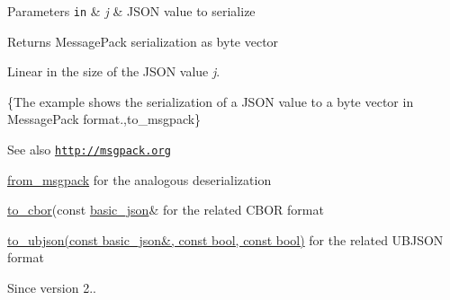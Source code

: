 \begin{DoxyParams}[1]{Parameters}
\mbox{\tt in}  & {\em j} & J\+S\+ON value to serialize \\
\hline
\end{DoxyParams}
\begin{DoxyReturn}{Returns}
Message\+Pack serialization as byte vector
\end{DoxyReturn}
Linear in the size of the J\+S\+ON value {\itshape j}.

\{The example shows the serialization of a J\+S\+ON value to a byte vector in Message\+Pack format.,to\+\_\+msgpack\}

\begin{DoxySeeAlso}{See also}
\href{http://msgpack.org}{\tt http\+://msgpack.\+org} 

\hyperlink{classnlohmann_1_1basic__json_adbcab52fca1e25b3311ef14e71a57590}{from\+\_\+msgpack} for the analogous deserialization 

\hyperlink{classnlohmann_1_1basic__json_adabcf74c9c868da3e04a5546b7705af4}{to\+\_\+cbor}(const \hyperlink{classnlohmann_1_1basic__json}{basic\+\_\+json}\& for the related C\+B\+OR format 

\hyperlink{classnlohmann_1_1basic__json_a25355b9719db23b189fb5f6a8f4f16c4}{to\+\_\+ubjson(const basic\+\_\+json\&, const bool, const bool)} for the related U\+B\+J\+S\+ON format
\end{DoxySeeAlso}
\begin{DoxySince}{Since}
version 2.. 
\end{DoxySince}
